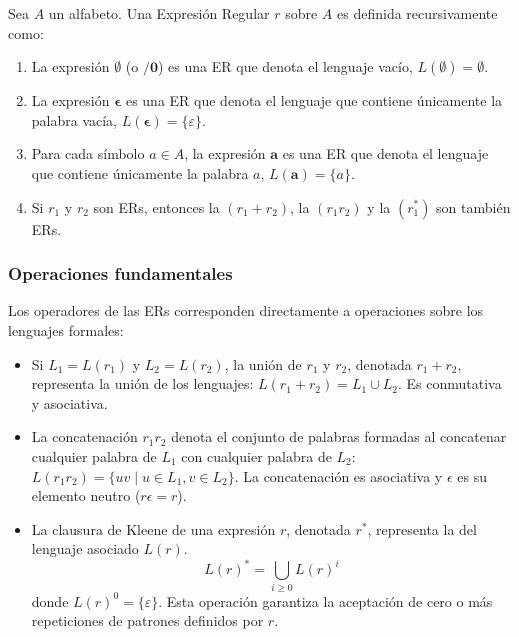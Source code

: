 \begin{definicion}
Sea $A$ un alfabeto. Una Expresión Regular $r$ sobre $A$ es definida recursivamente como:
\begin{enumerate}
    \item La expresión $\mathbf{\emptyset}$ (o $\mathbf{/0}$) es una ER que denota el lenguaje vacío, $L(\mathbf{\emptyset}) = \emptyset$.
    \item La expresión $\mathbf{\epsilon}$ es una ER que denota el lenguaje que contiene únicamente la palabra vacía, $L(\mathbf{\epsilon}) = \{\varepsilon\}$.
    \item Para cada símbolo $a \in A$, la expresión $\mathbf{a}$ es una ER que denota el lenguaje que contiene únicamente la palabra $a$, $L(\mathbf{a}) = \{a\}$.
    \item Si $r_1$ y $r_2$ son ERs, entonces la  $(r_1 + r_2)$, la  $(r_1 r_2)$ y la  $(r_1^*)$ son también ERs.
\end{enumerate}
\end{definicion}

\subsubsection{Operaciones fundamentales}

Los operadores de las ERs corresponden directamente a operaciones sobre los lenguajes formales:

\begin{itemize}
    \item {}
    Si $L_1 = L(r_1)$ y $L_2 = L(r_2)$, la unión de $r_1$ y $r_2$, denotada $r_1 + r_2$, representa la unión de los lenguajes: $L(r_1 + r_2) = L_1 \cup L_2$. Es conmutativa y asociativa.

    \item {}
    La concatenación $r_1 r_2$ denota el conjunto de palabras formadas al concatenar cualquier palabra de $L_1$ con cualquier palabra de $L_2$: $L(r_1 r_2) = \{uv \mid u \in L_1, v \in L_2\}$. La concatenación es asociativa y $\epsilon$ es su elemento neutro ($r\epsilon = r$).

    \item {}
    La clausura de Kleene de una expresión $r$, denotada $r^*$, representa la  del lenguaje asociado $L(r)$.
    \[ L(r)^* = \bigcup_{i \geq 0} L(r)^i \]
    donde $L(r)^0 = \{\varepsilon\}$. Esta operación garantiza la aceptación de cero o más repeticiones de patrones definidos por $r$.
\end{itemize}

